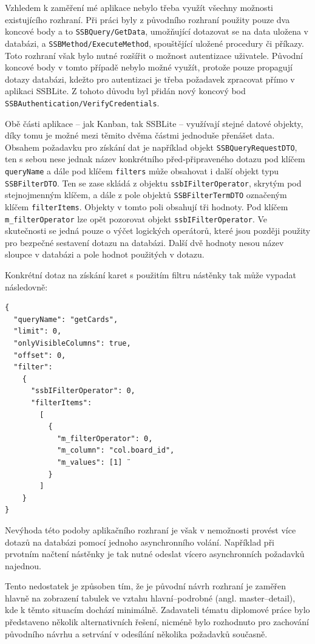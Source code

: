 Vzhledem k zaměření mé aplikace nebylo třeba využít všechny možnosti existujícího rozhraní. Při práci byly z původního rozhraní použity pouze dva koncové body a to \texttt{SSBQuery/GetData}, umožňující dotazovat se na data uložena v databázi, a \sloppy\texttt{SSBMethod/ExecuteMethod}, spouštějící uložené procedury či příkazy. Toto rozhraní však bylo nutné rozšířit o možnost autentizace uživatele. Původní koncové body v tomto případě nebylo možné využít, protože pouze propagují dotazy databázi, kdežto pro autentizaci je třeba požadavek zpracovat přímo v aplikaci SSBLite. Z tohoto důvodu byl přidán nový koncový bod \sloppy\texttt{SSBAuthentication/VerifyCredentials}.

Obě části aplikace -- jak Kanban, tak SSBLite -- využívají stejné datové objekty, díky tomu je možné mezi těmito dvěma částmi jednoduše přenášet data. Obsahem požadavku pro získání dat je například objekt \texttt{SSBQueryRequestDTO}, ten s sebou nese jednak název konkrétního před-připraveného dotazu pod klíčem \texttt{queryName} a dále pod klíčem \texttt{filters} může obsahovat i další objekt typu \texttt{SSBFilterDTO}. Ten se zase skládá z objektu \texttt{ssbIFilterOperator}, skrytým pod stejnojmenným klíčem, a dále z pole objektů \texttt{SSBFilterTermDTO} označeným klíčem \texttt{filterItems}. Objekty v tomto poli obsahují tři hodnoty. Pod klíčem \texttt{m\_filterOperator} lze opět pozorovat objekt \texttt{ssbIFilterOperator}. Ve skutečnosti se jedná pouze o výčet logických operátorů, které jsou později použity pro bezpečné sestavení dotazu na databázi. Další dvě hodnoty nesou název sloupce v databázi a pole hodnot použitých v dotazu.

Konkrétní dotaz na získání karet s použitím filtru nástěnky tak může vypadat následovně:

\begin{verbatim}
{
  "queryName": "getCards",
  "limit": 0,
  "onlyVisibleColumns": true,
  "offset": 0,
  "filter":
    {
      "ssbIFilterOperator": 0,
      "filterItems":
        [
          {
            "m_filterOperator": 0,
            "m_column": "col.board_id",
            "m_values": [1] ¨
          }
        ]
    }
}
\end{verbatim}

Nevýhoda této podoby aplikačního rozhraní je však v nemožnosti provést více dotazů na databázi pomocí jednoho asynchronního volání. Například při prvotním načtení nástěnky je tak nutné odeslat vícero asynchronních požadavků najednou.

Tento nedostatek je způsoben tím, že je původní návrh rozhraní je zaměřen hlavně na zobrazení tabulek ve vztahu hlavní--podrobné (angl. master--detail), kde k těmto situacím dochází minimálně. Zadavateli tématu diplomové práce bylo představeno několik alternativních řešení, nicméně bylo rozhodnuto pro zachování původního návrhu a setrvání v odesílání několika požadavků současně. 

